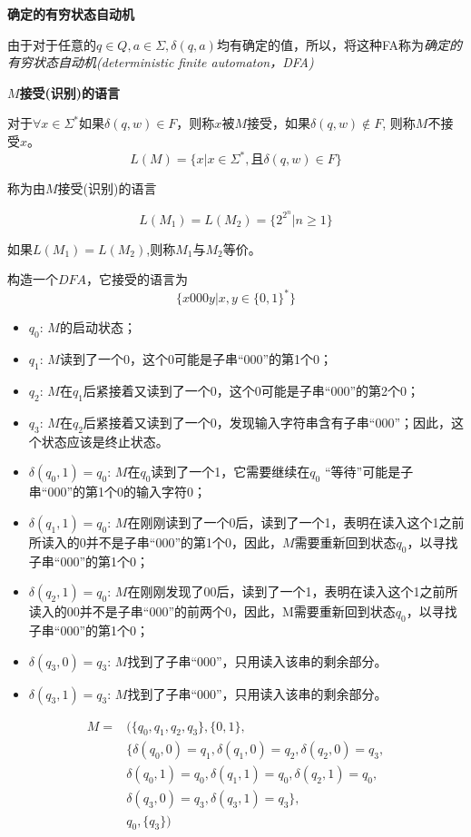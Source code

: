 \textbf{确定的有穷状态自动机}

由于对于任意的$q\in Q, a\in\Sigma, \delta(q,a)$均有确定的值，所以，将这种FA称为\emph{确定的有穷状态自动机(deterministic finite automaton，DFA) }

\textbf{$M$接受(识别)的语言}

对于$\forall x\in\Sigma^{\ast}$如果$\delta(q,w)\in F$，则称$x$被$M$接受，如果$\delta(q,w)\notin F$, 则称$M$不接受$x$。
\[L(M)=\{x|x\in\Sigma^{\ast},\text{且}\delta(q,w)\in F\}\]

称为由$M$接受(识别)的语言 

\[L(M_1)=L(M_2)=\{2^{2^n}|n\ge 1\}\]

如果$L(M_1)=L(M_2)$,则称$M_1$与$M_2$等价。

\begin{example}构造一个$DFA$，它接受的语言为
	\[\{x000y|x,y\in\{0,1\}^{\ast}\}\]
	\begin{itemize}
		\item $q_0$: $M$的启动状态；
	    \item $q_1$: $M$读到了一个0，这个0可能是子串“000”的第1个0；
	    \item $q_2$: $M$在$q_1$后紧接着又读到了一个0，这个0可能是子串“000”的第2个0；
		\item $q_3$: $M$在$q_2$后紧接着又读到了一个0，发现输入字符串含有子串“000”；因此，这个状态应该是终止状态。
	    \item $\delta(q_0,1)= q_0$: $M$在$q_0$读到了一个1，它需要继续在$q_0$ “等待”可能是子串“000”的第1个0的输入字符0；
		\item $\delta(q_1,1)= q_0$: $M$在刚刚读到了一个0后，读到了一个1，表明在读入这个1之前所读入的0并不是子串“000”的第1个0，因此，$M$需要重新回到状态$q_0$，以寻找子串“000”的第1个0；
		
		\item $\delta(q_2,1)= q_0$: $M$在刚刚发现了00后，读到了一个1，表明在读入这个1之前所读入的00并不是子串“000”的前两个0，因此，M需要重新回到状态$q_0$，以寻找子串“000”的第1个0；
		
		\item $\delta(q_3,0)= q_3$: $M$找到了子串“000”，只用读入该串的剩余部分。
		
		\item $\delta(q_3,1)= q_3$: $M$找到了子串“000”，只用读入该串的剩余部分。	
	\end{itemize}
	\begin{align*} 
	M=&(\{q_0,q_1,q_2,q_3\},\{0,1\},\\
	&\{\delta(q_0,0)=q_1,\delta(q_1,0)=q_2,\delta(q_2,0)=q_3,\\
	&\delta(q_0,1)=q_0,\delta(q_1,1)=q_0,\delta(q_2,1)=q_0,\\
	&\delta(q_3,0)=q_3,\delta(q_3,1)=q_3\},\\
	&q_0,\{q_3\})
	\end{align*}
	

\end{example}
